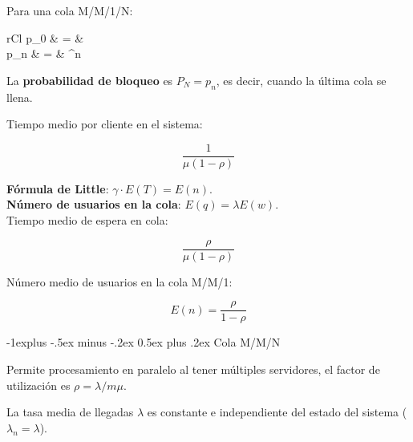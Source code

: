\documentclass[9pt,landscape]{extarticle}
\makeatletter
\renewcommand{\subsection}{\@startsection{subsection}{2}{0mm}%
                                {-1explus -.5ex minus -.2ex}%
                                {0.5ex plus .2ex}%
                                {\normalfont\normalsize\bfseries}}
\makeatother
\begin{document}
\begin{multicols}{3}
Para una cola M/M/1/N:
	
	\begin{IEEEeqnarray*}{rCl}
		p_{0} & = &  \\
		p_{n} & = &  \cdot \rho^{n}
	\end{IEEEeqnarray*}

La \textbf{probabilidad de bloqueo} es $P_{N} = p_{n}$, es decir, cuando la última cola se llena.

Tiempo medio por cliente en el sistema:

	\begin{equation*}
	\frac{1}{\mu ( 1 - \rho)}
	\end{equation*}

\textbf{Fórmula de Little}: $\gamma \cdot E(T) = E(n)$.\\
\textbf{Número de usuarios en la cola}: $E(q) = \lambda E(w)$.\\
	
Tiempo medio de espera en cola:

	\begin{equation*}
	\frac{\rho}{\mu (1 - \rho)}
	\end{equation*}

Número medio de usuarios en la cola M/M/1:

	\begin{equation*}
		E(n) = \frac{\rho}{1 - \rho}
	\end{equation*}

\subsection{Cola M/M/N}

Permite procesamiento en paralelo al tener múltiples servidores, el factor de utilización es $\rho = \lambda / m \mu$.

La tasa media de llegadas $\lambda$ es constante e independiente del estado del sistema ($\lambda_{n} = \lambda$).

 \vspace{-5pt}
\begin{center}
\end{center}
\end{multicols}
\end{document}
